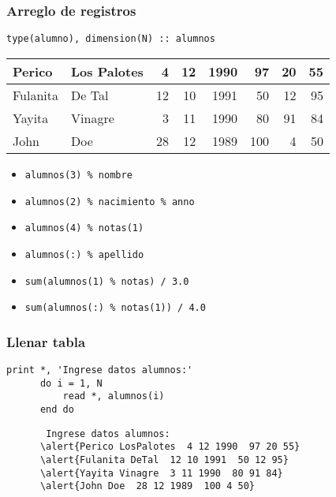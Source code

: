 \documentclass[12pt]{beamer}
\begin{document}
  \begin{frame}[fragile]
    \frametitle{Arreglo de registros}
    \begin{lstlisting}[gobble=6]
      type(alumno), dimension(N) :: alumnos
    \end{lstlisting}
    \vspace{1em}
    \begin{tabular}{|l||l||r|r|r||r|r|r|}\hline
      Perico & Los Palotes &  4 & 12 & 1990 & 97 & 20 & 55 \\\hline
      Fulanita & De Tal    & 12 & 10 & 1991 & 50 & 12 & 95 \\\hline
      Yayita & Vinagre     &  3 & 11 & 1990 & 80 & 91 & 84 \\\hline
      John & Doe           & 28 & 12 & 1989 & 100 & 4 & 50 \\\hline
    \end{tabular}
    \vspace{1em}
    \pause
    \begin{itemize}
      \item \lstinline!alumnos(3) % nombre! \pause
      \item \lstinline!alumnos(2) % nacimiento % anno! \pause
      \item \lstinline!alumnos(4) % notas(1)! \pause
      \item \lstinline!alumnos(:) % apellido! \pause
      \item \lstinline!sum(alumnos(1) % notas) / 3.0! \pause
      \item \lstinline!sum(alumnos(:) % notas(1)) / 4.0!
    \end{itemize}

\end{frame}

  \begin{frame}[fragile]
    \frametitle{Llenar tabla}
    \begin{lstlisting}[gobble=6]
      print *, 'Ingrese datos alumnos:'
      do i = 1, N
          read *, alumnos(i)
      end do
    \end{lstlisting}
    \begin{Verbatim}
       Ingrese datos alumnos:
      \alert{Perico LosPalotes  4 12 1990  97 20 55}
      \alert{Fulanita DeTal  12 10 1991  50 12 95}
      \alert{Yayita Vinagre  3 11 1990  80 91 84}
      \alert{John Doe  28 12 1989  100 4 50}
    \end{Verbatim}

\end{frame}
\end{document}
